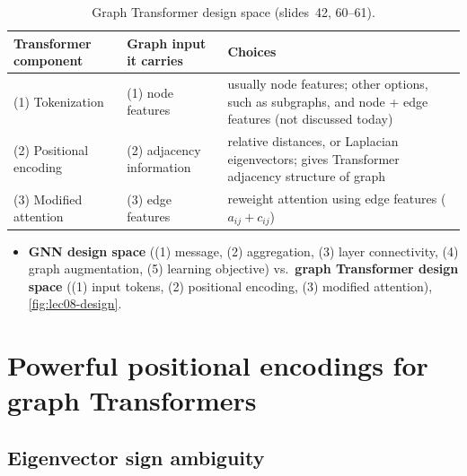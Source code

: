 \begin{table}[htbp]
  \centering\small
  \caption{Graph Transformer design space (slides~42, 60--61).}
  \label{tab:lec08-design}
  \renewcommand{\arraystretch}{1.2}
  \begin{tabularx}{\textwidth}{@{}>{\raggedright\arraybackslash}p{3.0cm}>{\raggedright\arraybackslash}p{3.3cm}>{\raggedright\arraybackslash}X@{}}
    \toprule
    Transformer component & Graph input it carries & Choices\\
    \midrule
    (1) Tokenization & (1) node features & usually node features; other options,
      such as subgraphs, and node + edge features (not discussed today)\\
    (2) Positional encoding & (2) adjacency information & relative distances, or
      Laplacian eigenvectors; gives Transformer adjacency structure of graph\\
    (3) Modified attention & (3) edge features & reweight attention using edge
      features ($a_{ij}+c_{ij}$)\\
    \bottomrule
  \end{tabularx}
\end{table}
\begin{itemize}
  \item \textbf{GNN design space} ((1) message, (2) aggregation, (3) layer
    connectivity, (4) graph augmentation, (5) learning objective) vs.\
    \textbf{graph Transformer design space} ((1) input tokens, (2) positional
    encoding, (3) modified attention), \cref{fig:lec08-design}.
\end{itemize}

\section{Powerful positional encodings for graph Transformers}\label{sec:lec08-ppe}

\subsection{Eigenvector sign ambiguity}\label{sec:lec08-sign}

